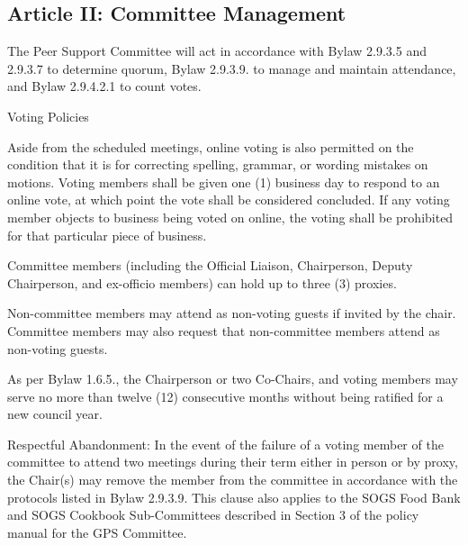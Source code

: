\subsection{Article II: Committee Management}
\begin{longenum}[ label*=\thesubsection.\arabic*., align=left] 		
\item The Peer Support Committee will act in accordance with Bylaw 2.9.3.5 and 2.9.3.7 to determine quorum, Bylaw 2.9.3.9. to manage and maintain attendance, and Bylaw 2.9.4.2.1 to count votes.
\item Voting Policies
	\begin{longenum}[label*=\arabic*., align=left]
	\item Aside from the scheduled meetings, online voting is also permitted on the condition that it is for correcting spelling, grammar, or wording mistakes on motions. Voting members shall be given one (1) business day to respond to an online vote, at which point the vote shall be considered concluded. If any voting member objects to business being voted on online, the voting shall be prohibited for that particular piece of business.
	\item Committee members (including the Official Liaison, Chairperson, Deputy Chairperson, and ex-officio members) can hold up to three (3) proxies.
	\end{longenum}
\item Non-committee members may attend as non-voting guests if invited by the chair. Committee members may also request that non-committee members attend as non-voting guests. 
\item As per Bylaw 1.6.5., the Chairperson or two Co-Chairs, and voting members may serve no more than twelve (12) consecutive months without being ratified for a new council year.
\item Respectful Abandonment: In the event of the failure of a voting member of the committee to attend two meetings during their term either in person or by proxy, the Chair(s) may remove the member from the committee in accordance with the protocols listed in Bylaw 2.9.3.9. This clause also applies to the SOGS Food Bank and SOGS Cookbook Sub-Committees described in Section 3 of the policy manual for the GPS Committee.
\end{longenum}

